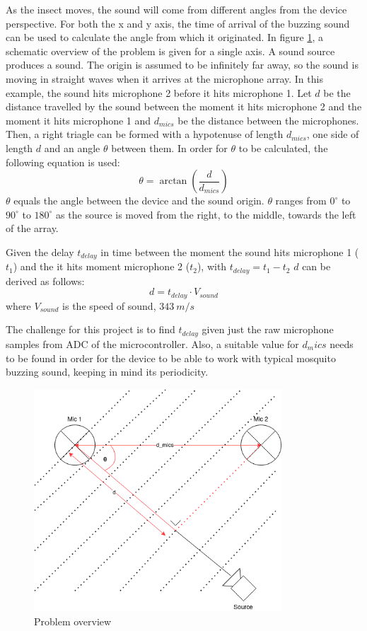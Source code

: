 \documentclass[a4paper]{article}
\begin{document}
As the insect moves, the sound will come from different angles from the device perspective. For both the x and y axis, the time of arrival of the buzzing sound can be used to calculate the angle from which it originated. In figure \ref{fig:problem_overview}, a schematic overview of the problem is given for a single axis. A sound source produces a sound. The origin is assumed to be infinitely far away, so the sound is moving in straight waves when it arrives at the microphone array. In this example, the sound hits microphone 2 before it hits microphone 1. Let $d$ be the distance travelled by the sound between the moment it hits microphone 2 and the moment it hits microphone 1 and $d_{mics}$ be the distance between the microphones. Then, a right triagle can be formed with a hypotenuse of length $d_{mics}$, one side of length $d$ and an angle $\theta$ between them. In order for $\theta$ to be calculated, the following equation is used:\[\theta = \arctan(\frac{d}{d_{mics}})\] $\theta$ equals the angle between the device and the sound origin. $\theta$ ranges from $0^{\circ}$ to $90^{\circ}$ to $180^{\circ}$ as the source is moved from the right, to the middle, towards the left of the array. 

Given the delay $t_{delay}$ in time between the moment the sound hits microphone 1 ($t_1$) and the it hits moment microphone 2 ($t_2$), with $t_{delay} = t_1 - t_2$ $d$ can be derived as follows:\[d = t_{delay} \cdot V_{sound}\]where $V_{sound}$ is the speed of sound, $343\ m/s$

The challenge for this project is to find $t_{delay}$ given just the raw microphone samples from ADC of the microcontroller. Also, a suitable value for $d_mics$ needs to be found in order for the device to be able to work with typical mosquito buzzing sound, keeping in mind its periodicity.

\begin{figure}
    \begin{center}
        \includegraphics[width=25em]{assets/problem_overview.png}
        \caption{Problem overview}
        \label{fig:problem_overview}
    \end{center}
\end{figure}
\end{document}
